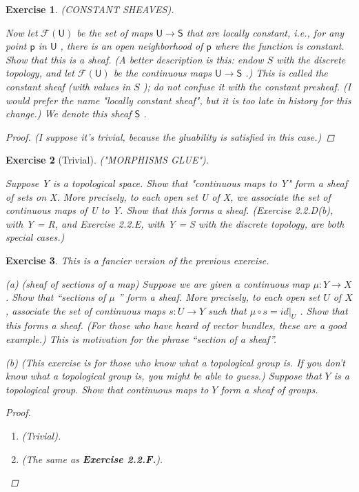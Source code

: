 \documentclass{article}
\theoremstyle{breakstyle}
\newtheorem{exercise}{Exercise}[section]
\begin{document}
\begin{exercise}
(CONSTANT SHEAVES).

Now let $\mathcal{F}(\mathsf{U})$ be the set of maps $\mathsf{U} \to \mathsf{S}$
that are locally constant, i.e., for any point $\mathsf{p}$ in $\mathsf{U}$ ,
there is an open neighborhood of $\mathsf{p}$ where the function is constant.
Show that this is a sheaf. (A better description is this: endow $S$ with the
discrete topology, and let $\mathcal{F}(\mathsf{U})$ be the continuous maps
$\mathsf{U} \to \mathsf{S}$ .) This is called the constant sheaf (with values in
$S$ ); do not confuse it with the constant presheaf. (I would prefer the name
"locally constant sheaf", but it is too late in history for this change.) We
denote this sheaf $\underline{\mathsf{S}}$ .

\begin{proof}
    \emph{(I suppose it's trivial, because the gluability is satisfied in this
    case.)}
\end{proof}

\end{exercise}

\begin{exercise}[Trivial]
("MORPHISMS GLUE").

Suppose Y is a topological space. Show that "continuous maps to Y" form a sheaf
of sets on X. More precisely, to each open set U of X, we associate the set of
continuous maps of U to Y. Show that this forms a sheaf. (Exercise 2.2.D(b),
with Y = R, and Exercise 2.2.E, with Y = S with the discrete topology, are both
special cases.)
\end{exercise}

\begin{exercise}
This is a fancier version of the previous exercise.

(a) (sheaf of sections of a map) Suppose we are given a continuous map $\mu: Y
\to X$ . Show that “sections of $\mu$ ” form a sheaf. More precisely, to each
open set $U$ of $X$ , associate the set of continuous maps $s: U \to Y$ such
that $\mu \circ s = id|_{U}$ . Show that this forms a sheaf. (For those who have
heard of vector bundles, these are a good example.) This is motivation for the
phrase “section of a sheaf”.

(b) (This exercise is for those who know what a topological group is. If you
don't know what a topological group is, you might be able to guess.) Suppose
that $Y$ is a topological group. Show that continuous maps to $Y$ form a sheaf
of groups.

\begin{proof}
    \begin{enumerate}[label=({\alph*})]
        \item 
            \emph{(Trivial)}.
        \item 
            \emph{(The same as \textbf{Exercise 2.2.F.})}.
    \end{enumerate}
\end{proof}

\end{exercise}
\end{document}
